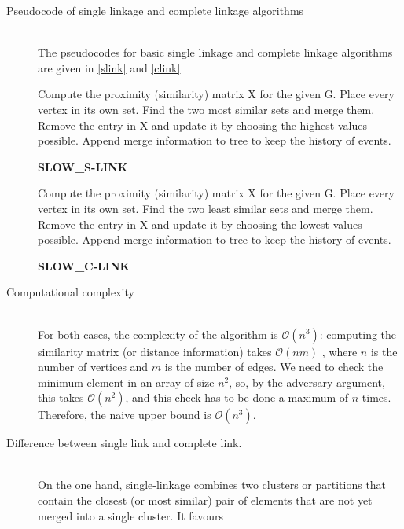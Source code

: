 \documentclass[12pt,a4paper]{article}
\begin{document}
\begin{description}
\item[Pseudocode of single linkage and complete linkage algorithms] \hfill
  \\
  The pseudocodes for basic single linkage and complete linkage
  algorithms are given in \ref{slink} and \ref{clink}
  \begin{algorithm}[h]
    \SetAlgoLined

    \nl Compute the proximity (similarity) matrix X for the given G.\;
    \nl Place every vertex in its own set.\;
    \nl Find the two most similar sets and merge them.\;
    \nl Remove the entry in X and update it by choosing the highest
    values possible.\;
    \nl Append merge information to tree to keep the history of events.\;
    \nl {}
    \caption{\bf SLOW_S-LINK}
    \label{slink}
  \end{algorithm}

  \begin{algorithm}[h]
    \SetAlgoLined

    \nl Compute the proximity (similarity) matrix X for the given G.\;
    \nl Place every vertex in its own set.\;
    \nl Find the two least similar sets and merge them.\;
    \nl Remove the entry in X and update it by choosing the lowest
    values possible.\;
    \nl Append merge information to tree to keep the history of events.\;
    \nl {}
    \caption{\bf SLOW_C-LINK}
    \label{clink}
  \end{algorithm}

\item[Computational complexity] \hfill \\

  For both cases, the complexity of the algorithm is
  $\mathcal{O}(n^3)$: computing the similarity matrix (or distance
  information) takes $\mathcal{O}(nm)$ \cite{newman}, where $n$ is the
  number of vertices and $m$ is the number of edges. We need to check
  the minimum element in an array of size $n^2$, so, by the adversary
  argument, this takes $\mathcal{O}(n^2)$, and this check has to be
  done a maximum of $n$ times. Therefore, the naive upper bound is
  $\mathcal{O}(n^3)$.

\item[Difference between single link and complete link.] \hfill \\
  On the one hand, single-linkage combines two clusters or partitions
  that contain the closest (or most similar) pair of elements that are
  not yet merged into a single cluster. It favours


\end{description}
\end{document}
